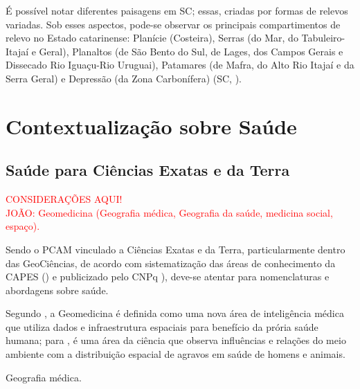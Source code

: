 \indent É possível notar diferentes paisagens em \acrlong{SC}; essas, criadas por formas de relevos variadas. Sob esses aspectos, pode-se observar os principais compartimentos de relevo no Estado catarinense: Planície (Costeira), Serras (do Mar, do Tabuleiro-Itajaí e Geral), Planaltos (de São Bento do Sul, de Lages, dos Campos Gerais e Dissecado Rio Iguaçu-Rio Uruguai), Patamares (de Mafra, do Alto Rio Itajaí e da Serra Geral) e Depressão (da Zona Carbonífera) (\acrlong{SC}, \citeyear{AtlasSCnatureza}).

\section{Contextualização sobre Saúde}

\subsection{Saúde para Ciências Exatas e da Terra}

\begin{center}
\textcolor{red}{CONSIDERAÇÕES AQUI!}\\
\textcolor{red}{JOÃO: Geomedicina (Geografia médica, Geografia da saúde, medicina social, espaço).}\\
\end{center}

\indent Sendo o \acrfull{PCAM} vinculado a Ciências Exatas e da Terra, particularmente dentro das GeoCiências, de acordo com sistematização das áreas de conhecimento da \acrfull{CAPES} (\citeyear{CAPES_Tabela_Conhecimento}) e publicizado pelo \acrfull{CNPq} \citeyear{CNPq_Tabela_Conhecimento}), deve-se atentar para nomenclaturas e abordagens sobre saúde.

\indent Segundo , a Geomedicina é definida como uma nova área de inteligência médica que utiliza dados e infraestrutura espaciais para benefício da prória saúde humana; para , é uma área da ciência que observa influências e relações do meio ambiente com a distribuição espacial de agravos em saúde de homens e animais.

\indent Geografia médica.

